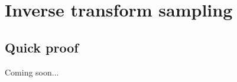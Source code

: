 \documentclass{scrreprt}
\begin{document}
\section{Inverse transform sampling}

\subsection*{Quick proof}
Coming soon...
\end{document}
